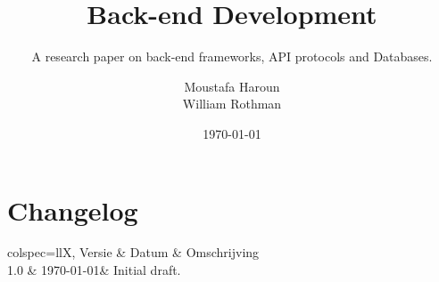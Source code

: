 \documentclass[fleqn,12pt]{article}
\title{Back-end Development}
\subtitle{A research paper on back-end frameworks, API protocols and Databases.}
\author{Moustafa Haroun\\William Rothman} %
\date{\today}
\begin{document}
\maketitle

\newpage
\section{Changelog}\label{sec:changelog}

\begin{htable}[
		caption = {Changelog},
		label = {tab:changelog},
	]{
		colspec={llX},
	}
	Versie & Datum & Omschrijving \\
	1.0 & \today & Initial draft. \\
\end{htable}

\newpage
\tableofcontents

\newpage


\newpage


\newpage


\newpage


\newpage


\newpage
\printbibliography
\end{document}
